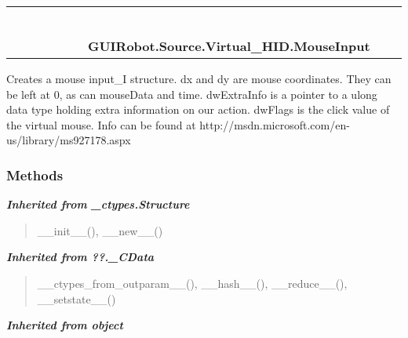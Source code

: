     \label{GUIRobot:Source:Virtual_HID:MouseInput}
\begin{tabular}{cccccccccc}
\multicolumn{2}{r}{\settowidth{\BCL}{object}\multirow{2}{\BCL}{object}}
&&
&&
&&
  \\\cline{3-3}
  &&\multicolumn{1}{c|}{}
&&
&&
&&
  \\
\multicolumn{4}{r}{\settowidth{\BCL}{??.\_CData}\multirow{2}{\BCL}{??.\_CData}}
&&
&&
  \\\cline{5-5}
  &&&&\multicolumn{1}{c|}{}
&&
&&
  \\
\multicolumn{6}{r}{\settowidth{\BCL}{\_ctypes.Structure}\multirow{2}{\BCL}{\_ctypes.Structure}}
&&
  \\\cline{7-7}
  &&&&&&\multicolumn{1}{c|}{}
&&
  \\
&&&&&&\multicolumn{2}{l}{\textbf{GUIRobot.Source.Virtual\_HID.MouseInput}}
\end{tabular}

Creates a mouse input\_I structure. dx and dy are mouse coordinates. They 
can be left at 0, as can mouseData and time. dwExtraInfo is a pointer to a 
ulong data type holding extra information on our action. dwFlags is the 
click value of the virtual mouse. Info can be found at 
http://msdn.microsoft.com/en-us/library/ms927178.aspx



  \subsubsection{Methods}


\large{\textbf{\textit{Inherited from \_ctypes.Structure}}}

\begin{quote}
\_\_init\_\_(), \_\_new\_\_()
\end{quote}

\large{\textbf{\textit{Inherited from ??.\_CData}}}

\begin{quote}
\_\_ctypes\_from\_outparam\_\_(), \_\_hash\_\_(), \_\_reduce\_\_(), \_\_setstate\_\_()
\end{quote}

\large{\textbf{\textit{Inherited from object}}}

